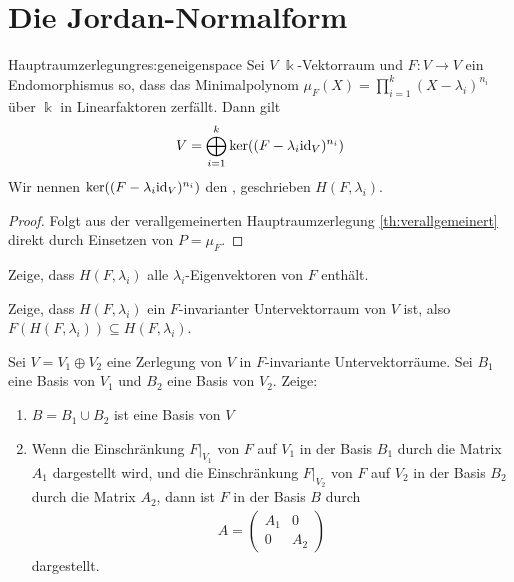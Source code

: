 \documentclass[10pt]{article}
\begin{document}
	\section{Die Jordan-Normalform}
	\begin{importantcorollary}{Hauptraumzerlegung}{res:geneigenspace}
		\label{res:geneigenspace}
		Sei $V$ $\Bbbk$-Vektorraum und $F : V \to V$ ein Endomorphismus so, dass das Minimalpolynom $\mu_F(X) = \prod_{i = 1}^k(X - \lambda_i)^{n_i}$ über $\Bbbk$ in Linearfaktoren zerfällt. Dann gilt
		\begin{align*}
			V = \bigoplus_{i = 1}^k \ker((F - \lambda_i \textnormal{id}_V)^{n_i})
		\end{align*}
		Wir nennen $\ker((F - \lambda_i \textnormal{id}_V)^{n_i})$ den , geschrieben $H(F, \lambda_i)$.
	\end{importantcorollary}
	\begin{proof}
		Folgt aus der verallgemeinerten Hauptraumzerlegung \ref{th:verallgemeinert} direkt durch Einsetzen von $P = \mu_F$.
	\end{proof}
	\begin{exercise}
		Zeige, dass $H(F,\lambda_i)$ alle $\lambda_i$-Eigenvektoren von $F$ enthält.
	\end{exercise}
	\begin{exercise}
		\label{res:hauptrauminvariant}
		Zeige, dass $H(F,\lambda_i)$ ein $F$-invarianter Untervektorraum von $V$ ist, also $F(H(F,\lambda_i)) \subseteq H(F,\lambda_i)$.
	\end{exercise}
	\begin{exercise}
		\label{res:matrixdirectsum}
		Sei $V = V_1 \oplus V_2$ eine Zerlegung von $V$ in $F$-invariante Untervektorräume. Sei $B_1$ eine Basis von $V_1$ und $B_2$ eine Basis von $V_2$. Zeige:
		\begin{enumerate}
			\item $B = B_1 \cup B_2$ ist eine Basis von $V$
			\item Wenn die Einschränkung $F|_{V_1}$ von $F$ auf $V_1$ in der Basis $B_1$ durch die Matrix $A_1$ dargestellt wird, und die Einschränkung $F|_{V_2}$ von $F$ auf $V_2$ in der Basis $B_2$ durch die Matrix $A_2$, dann ist $F$ in der Basis $B$ durch
			\begin{align*}
				A = 
				\begin{pmatrix}
					A_1 & 0\\
					0 & A_2
				\end{pmatrix}
			\end{align*}
			dargestellt.
		\end{enumerate}
	\end{exercise}
\end{document}
